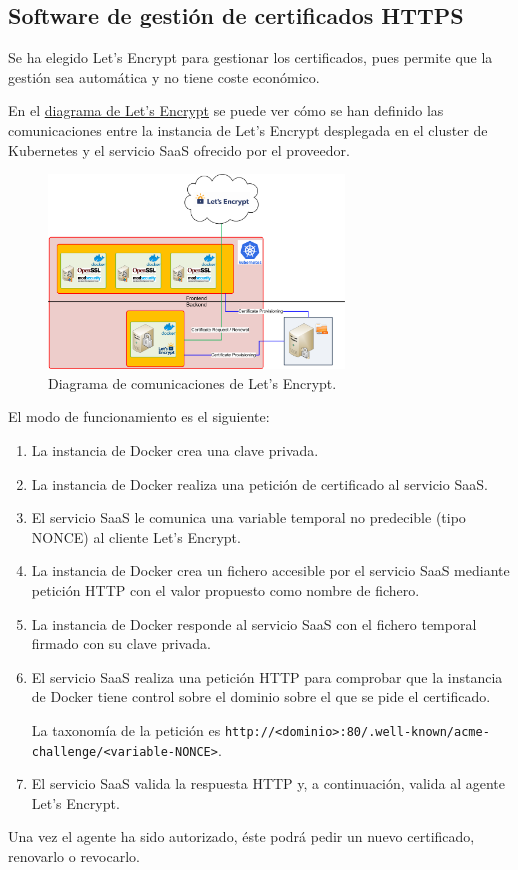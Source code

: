 \subsection{Software de gestión de certificados HTTPS}
\par Se ha elegido Let's Encrypt para gestionar los certificados, pues permite que la gestión sea automática y no tiene coste económico.
\par En el \hyperref[fig:Diagram_LetsEncypt_LLD]{diagrama de Let's Encrypt} se puede ver cómo se han definido las comunicaciones entre la instancia de Let's Encrypt desplegada en el cluster de Kubernetes y el servicio SaaS
ofrecido por el proveedor.
\begin{figure}[!ht]
  \centering
  \label{fig:Diagram_LetsEncypt_LLD}
  \includegraphics[width=0.7\textwidth]{fig/Diagram_LetsEncypt_LLD}
  \caption{Diagrama de comunicaciones de Let's Encrypt.}
\end{figure}
\par El modo de funcionamiento es el siguiente:
\begin{enumerate}
  \item La instancia de Docker crea una clave privada.
  \item La instancia de Docker realiza una petición de certificado al servicio SaaS.
  \item El servicio SaaS le comunica una variable temporal no predecible (tipo NONCE) al cliente Let's Encrypt.
  \item La instancia de Docker crea un fichero accesible por el servicio SaaS mediante petición HTTP con el valor propuesto como nombre de fichero.
  \item La instancia de Docker responde al servicio SaaS con el fichero temporal firmado con su clave privada.
  \item El servicio SaaS realiza una petición HTTP para comprobar que la instancia de Docker tiene control sobre el dominio sobre el que se pide el certificado.
    \par La taxonomía de la petición es \lstinline{http://<dominio>:80/.well-known/acme-challenge/<variable-NONCE>}.
  \item El servicio SaaS valida la respuesta HTTP y, a continuación, valida al agente Let's Encrypt.
\end{enumerate}
\par Una vez el agente ha sido autorizado, éste podrá pedir un nuevo certificado, renovarlo o revocarlo.

